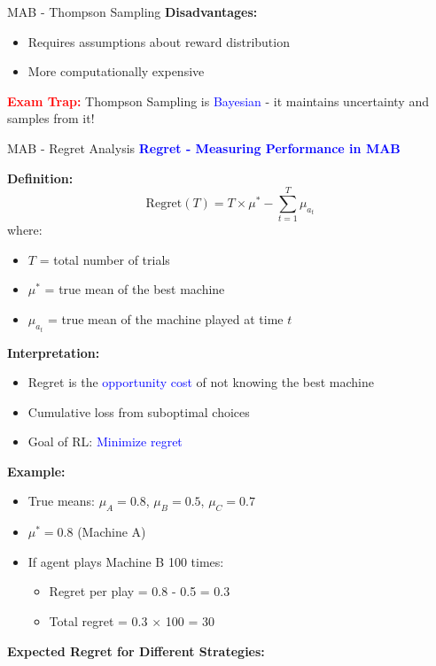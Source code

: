 \documentclass[8pt]{beamer}
\begin{document}
\begin{frame}{MAB - Thompson Sampling}
		\textbf{Disadvantages:}
		\begin{itemize}
			\item Requires assumptions about reward distribution
			\item More computationally expensive
		\end{itemize}
		
		\textcolor{red}{\textbf{Exam Trap:}} Thompson Sampling is \textcolor{blue}{Bayesian} - it maintains uncertainty and samples from it!
	\end{frame}
	
	\begin{frame}{MAB - Regret Analysis}
		\fontsize{6.5}{7.5}\selectfont
		\textcolor{blue}{\textbf{Regret - Measuring Performance in MAB}}
		
		\textbf{Definition:}
		\[
		\text{Regret}(T) = T \times \mu^* - \sum_{t=1}^T \mu_{a_t}
		\]
		where:
		\begin{itemize}
			\item $T$ = total number of trials
			\item $\mu^*$ = true mean of the best machine
			\item $\mu_{a_t}$ = true mean of the machine played at time $t$
		\end{itemize}
		
		\textbf{Interpretation:}
		\begin{itemize}
			\item Regret is the \textcolor{blue}{opportunity cost} of not knowing the best machine
			\item Cumulative loss from suboptimal choices
			\item Goal of RL: \textcolor{blue}{Minimize regret}
		\end{itemize}
		
		\textbf{Example:}
		\begin{itemize}
			\item True means: $\mu_A = 0.8$, $\mu_B = 0.5$, $\mu_C = 0.7$
			\item $\mu^* = 0.8$ (Machine A)
			\item If agent plays Machine B 100 times:
			\begin{itemize}
				\item Regret per play = 0.8 - 0.5 = 0.3
				\item Total regret = 0.3 $\times$ 100 = 30
			\end{itemize}
		\end{itemize}
		
		\textbf{Expected Regret for Different Strategies:}
		

\end{frame}
\end{document}
